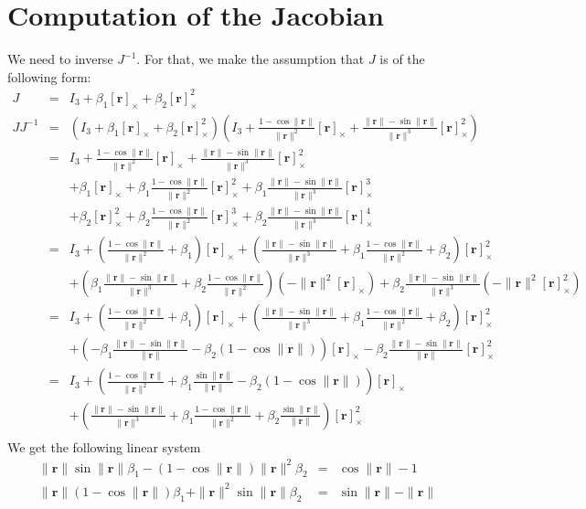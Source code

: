 \documentclass {article}
\newcommand\rot{\mathbf{r}}
\newcommand\rcross{[\rot]_{\times}}
\newcommand\normr{\|\rot\|}
\begin{document}
\section{Computation of the Jacobian}

We need to inverse $J^{-1}$. For that, we make the assumption that $J$ is of the following form:
\begin{eqnarray*}
J &=& I_3 + \beta_1 \rcross + \beta_2 \rcross^2\\
JJ^{-1} &=& \left(I_3 + \beta_1 \rcross + \beta_2 \rcross^2\right)\left(I_3  + \frac{1 - \cos \normr}{\normr^2}\rcross + \frac{\normr -\sin\normr}{\normr^3}\rcross^2\right)\\
&=& I_3  + \frac{1 - \cos \normr}{\normr^2}\rcross + \frac{\normr -\sin\normr}{\normr^3}\rcross^2\\
&& +  \beta_1 \rcross  + \beta_1 \frac{1 - \cos \normr}{\normr^2}\rcross^2 + \beta_1 \frac{\normr -\sin\normr}{\normr^3}\rcross^3\\
&& +  \beta_2 \rcross^2  + \beta_2 \frac{1 - \cos \normr}{\normr^2}\rcross^3 + \beta_2 \frac{\normr -\sin\normr}{\normr^3}\rcross^4\\
&=& I_3 + \left(\frac{1 - \cos \normr}{\normr^2} + \beta_1\right)\rcross + \left(\frac{\normr -\sin\normr}{\normr^3} + \beta_1 \frac{1 - \cos \normr}{\normr^2} + \beta_2\right)\rcross^2\\
&& + \left(\beta_1 \frac{\normr -\sin\normr}{\normr^3} + \beta_2 \frac{1 - \cos \normr}{\normr^2}\right)(- \normr^2 \rcross) + \beta_2 \frac{\normr -\sin\normr}{\normr^3}(- \normr^2 \rcross^2)\\
&=& I_3 + \left(\frac{1 - \cos \normr}{\normr^2} + \beta_1\right)\rcross + \left(\frac{\normr -\sin\normr}{\normr^3} + \beta_1 \frac{1 - \cos \normr}{\normr^2} + \beta_2\right)\rcross^2\\
&& + \left(- \beta_1 \frac{\normr -\sin\normr}{\normr} - \beta_2 (1 - \cos \normr)\right)\rcross - \beta_2 \frac{\normr -\sin\normr}{\normr}\rcross^2\\
&=& I_3 + \left(\frac{1 - \cos \normr}{\normr^2} + \beta_1 \frac{\sin\normr}{\normr} - \beta_2 (1 - \cos \normr)\right)\rcross \\
&& + \left(\frac{\normr -\sin\normr}{\normr^3} + \beta_1 \frac{1 - \cos \normr}{\normr^2} + \beta_2 \frac{\sin\normr}{\normr}\right)\rcross^2 \\
\end{eqnarray*}
We get the following linear system
\begin{eqnarray*}
\normr\sin\normr \beta_1 - (1 - \cos \normr)\normr^2 \beta_2 &=& \cos \normr - 1 \\
\normr(1 - \cos \normr)\beta_1 + \normr^2\sin\normr \beta_2 &=& \sin\normr - \normr
\end{eqnarray*}
\end{document}
